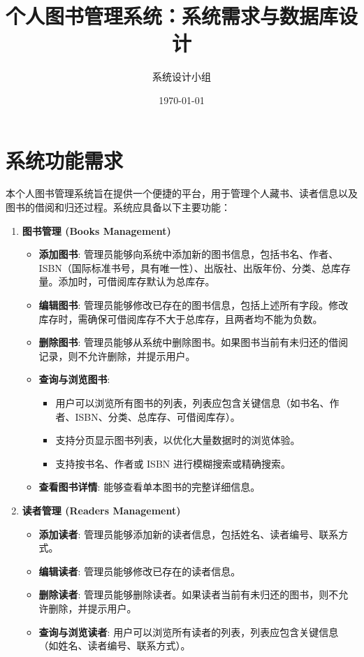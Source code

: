 \documentclass[11pt, a4paper]{article}
\title{个人图书管理系统：系统需求与数据库设计}
\author{系统设计小组}
\date{\today}
\begin{document}
\maketitle
\tableofcontents
\newpage

\section{系统功能需求}
本个人图书管理系统旨在提供一个便捷的平台，用于管理个人藏书、读者信息以及图书的借阅和归还过程。系统应具备以下主要功能：

\begin{enumerate}
    \item \textbf{图书管理 (Books Management)}
    \begin{itemize}
        \item \textbf{添加图书}: 管理员能够向系统中添加新的图书信息，包括书名、作者、ISBN（国际标准书号，具有唯一性）、出版社、出版年份、分类、总库存量。添加时，可借阅库存默认为总库存。
        \item \textbf{编辑图书}: 管理员能够修改已存在的图书信息，包括上述所有字段。修改库存时，需确保可借阅库存不大于总库存，且两者均不能为负数。
        \item \textbf{删除图书}: 管理员能够从系统中删除图书。如果图书当前有未归还的借阅记录，则不允许删除，并提示用户。
        \item \textbf{查询与浏览图书}:
        \begin{itemize}
            \item 用户可以浏览所有图书的列表，列表应包含关键信息（如书名、作者、ISBN、分类、总库存、可借阅库存）。
            \item 支持分页显示图书列表，以优化大量数据时的浏览体验。
            \item 支持按书名、作者或 ISBN 进行模糊搜索或精确搜索。
        \end{itemize}
        \item \textbf{查看图书详情}: 能够查看单本图书的完整详细信息。
    \end{itemize}

    \item \textbf{读者管理 (Readers Management)}
    \begin{itemize}
        \item \textbf{添加读者}: 管理员能够添加新的读者信息，包括姓名、读者编号、联系方式。
        \item \textbf{编辑读者}: 管理员能够修改已存在的读者信息。
        \item \textbf{删除读者}: 管理员能够删除读者。如果读者当前有未归还的图书，则不允许删除，并提示用户。
        \item \textbf{查询与浏览读者}: 用户可以浏览所有读者的列表，列表应包含关键信息（如姓名、读者编号、联系方式）。
    \end{itemize}


\end{enumerate}
\end{document}
